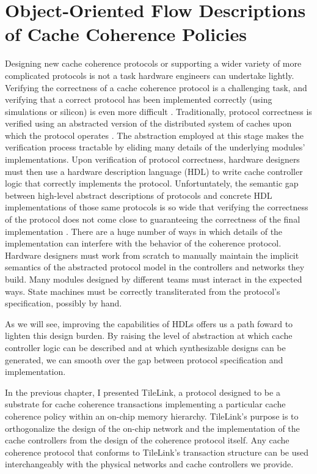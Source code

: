 \chapter{Object-Oriented Flow Descriptions of Cache Coherence Policies}
\label{c.coherence}

Designing new cache coherence protocols or supporting a wider variety of more complicated protocols is not a task hardware engineers can undertake lightly.
Verifying the correctness of a cache coherence protocol is a challenging task, and
verifying that a correct protocol has been implemented correctly (using simulations or silicon) is even more difficult
\cite{deorio2008post, bentley2001validating, burckhardt2005verifying, clarke1995verification, dill1992protocol, wood1990verifying}.
Traditionally, protocol correctness is verified using an abstracted version of the distributed system of caches upon which the protocol operates
\cite{talupur2008going, delzanno2003constraint, pong1997verification, wood1990verifying, mcmillan2001parameterized}.
The abstraction employed at this stage makes the verification process tractable by eliding many details of the underlying modules' implementations.
Upon verification of protocol correctness, hardware designers must then use a hardware description language (HDL) to write cache controller logic that correctly implements the protocol.
Unfortuntately, the semantic gap between high-level abstract descriptions of protocols and 
concrete HDL implementations of those same protocols is so wide that verifying the correctness of the protocol
does not come close to guaranteeing the correctness of the final implementation \cite{dave-memocode05}.
There are a huge number of ways in which details of the implementation can interfere with the behavior of the coherence protocol.
Hardware designers must work from scratch to manually maintain the implicit semantics of the abstracted protocol model in the controllers and networks they build.
Many modules designed by different teams must interact in the expected ways.
State machines must be correctly transliterated from the protocol's specification, possibly by hand.

As we will see, improving the capabilities of HDLs offers us a path foward to lighten this design burden.
By raising the level of abstraction at which cache controller logic can be described and at which synthesizable designs can be generated,
we can smooth over the gap between protocol specification and implementation.

In the previous chapter, I presented TileLink,
a protocol designed to be a substrate for cache coherence transactions implementing a particular cache coherence policy within an on-chip memory hierarchy. 
TileLink's purpose is to orthogonalize the design of the on-chip network 
and the implementation of the cache controllers from the design of the coherence protocol itself.
Any cache coherence protocol that conforms to TileLink’s transaction structure 
can be used interchangeably with the physical networks and cache controllers we provide.

